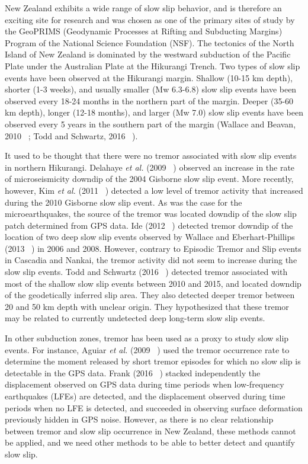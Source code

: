 \documentclass[letterpaper, 12pt]{article}
\begin{document}
New Zealand exhibits a wide range of slow slip behavior, and is therefore an exciting site for research and was chosen as one of the primary sites of study by the GeoPRIMS (Geodynamic Processes at Rifting and Subducting Margins) Program of the National Science Foundation (NSF). The tectonics of the North Island of New Zealand is dominated by the westward subduction of the Pacific Plate under the Australian Plate at the Hikurangi Trench. Two types of slow slip events have been observed at the Hikurangi margin. Shallow (10-15 km depth), shorter (1-3 weeks), and usually smaller (Mw 6.3-6.8) slow slip events have been observed every 18-24 months in the northern part of the margin. Deeper (35-60 km depth), longer (12-18 months), and larger (Mw 7.0) slow slip events have been observed every 5 years in the southern part of the margin (Wallace and Beavan, 2010 ~\cite{WAL_2010}; Todd and Schwartz, 2016 ~\cite{TOD_2016}).

It used to be thought that there were no tremor associated with slow slip events in northern Hikurangi. Delahaye \textit{et al.} (2009 ~\cite{DEL_2009}) observed an increase in the rate of microseismicity downdip of the 2004 Gisborne slow slip event. More recently, however, Kim \textit{et al.} (2011 ~\cite{KIM_2011}) detected a low level of tremor activity that increased during the 2010 Gisborne slow slip event. As was the case for the microearthquakes, the source of the tremor was located downdip of the slow slip patch determined from GPS data. Ide (2012 ~\cite{IDE_2012}) detected tremor downdip of the location of two deep slow slip events observed by Wallace and Eberhart-Phillips (2013 ~\cite{WAL_2013}) in 2006 and 2008. However, contrary to Episodic Tremor and Slip events in Cascadia and Nankai, the tremor activity did not seem to increase during the slow slip events. Todd and Schwartz (2016 ~\cite{TOD_2016}) detected tremor associated with most of the shallow slow slip events between 2010 and 2015, and located downdip of the geodetically inferred slip area. They also detected deeper tremor between 20 and 50 km depth with unclear origin. They hypothesized that these tremor may be related to currently undetected deep long-term slow slip events.

In other subduction zones, tremor has been used as a proxy to study slow slip events. For instance, Aguiar \textit{et al.} (2009 ~\cite{AGU_2009}) used the tremor occurrence rate to determine the moment released by short tremor episodes for which no slow slip is detectable in the GPS data. Frank (2016 ~\cite{FRA_2016}) stacked independently the displacement observed on GPS data during time periods when low-frequency earthquakes (LFEs) are detected, and the displacement observed during time periods when no LFE is detected, and succeeded in observing surface deformation previously hidden in GPS noise. However, as there is no clear relationship between tremor and slow slip occurrence in New Zealand, these methods cannot be applied, and we need other methods to be able to better detect and quantify slow slip.
\end{document}
